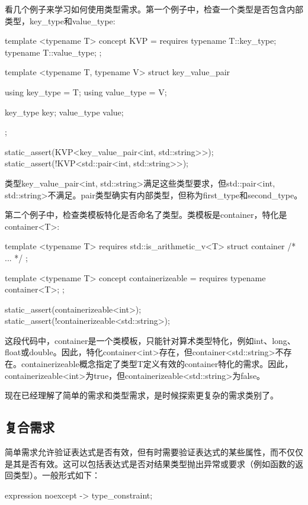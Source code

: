 看几个例子来学习如何使用类型需求。第一个例子中，检查一个类型是否包含内部类型，key\_type和value\_type:

\begin{cpp}
template <typename T>
concept KVP = requires
{
	typename T::key_type;
	typename T::value_type;
};

template <typename T, typename V>
struct key_value_pair
{
	using key_type = T;
	using value_type = V;
	
	key_type key;
	value_type value;
};

static_assert(KVP<key_value_pair<int, std::string>>);
static_assert(!KVP<std::pair<int, std::string>>);
\end{cpp}

类型key\_value\_pair<int, std::string>满足这些类型要求，但std::pair<int, std::string>不满足。pair类型确实有内部类型，但称为first\_type和second\_type。

第二个例子中，检查类模板特化是否命名了类型。类模板是container，特化是container<T>:

\begin{cpp}
template <typename T>
requires std::is_arithmetic_v<T>
struct container
{ /* ... */ };

template <typename T>
concept containerizeable = requires {
	typename container<T>;
};

static_assert(containerizeable<int>);
static_assert(!containerizeable<std::string>);
\end{cpp}

这段代码中，container是一个类模板，只能针对算术类型特化，例如int、long、float或double。因此，特化container<int>存在，但container<std::string>不存在。containerizeable概念指定了类型T定义有效的container特化的需求。因此，containerizeable<int>为true，但containerizeable<std::string>为false。

现在已经理解了简单的需求和类型需求，是时候探索更复杂的需求类别了。

\subsection{复合需求}

简单需求允许验证表达式是否有效，但有时需要验证表达式的某些属性，而不仅仅是其是否有效。这可以包括表达式是否对结果类型抛出异常或要求（例如函数的返回类型）。一般形式如下：

\begin{cpp}
{ expression } noexcept -> type_constraint;
\end{cpp}


